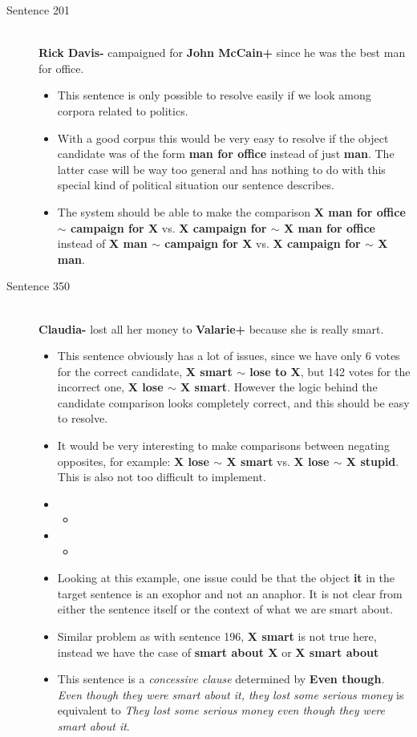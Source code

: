 \documentclass{article}
\newcommand{\insertcode}[2]{\begin{itemize}\item[]\end{itemize}} %
\begin{document}
\begin{description}
  \item[Sentence 201] \hfill \\
  {\bf Rick Davis-} campaigned for {\bf John McCain+} since he was the best man for office.
  \begin{itemize}
  	\item This sentence is only possible to resolve easily if we look among corpora related to politics.
  	\item With a good corpus this would be very easy to resolve if the object candidate was of the form {\bf man for office} instead of just {\bf man}. The latter case will be way too general and has nothing to do with this special kind of political situation our sentence describes.
  	\item The system should be able to make the comparison {\bf X man for office $\sim$ campaign for X} vs. {\bf X campaign for $\sim$ X man for office} instead of {\bf X man $\sim$ campaign for X} vs. {\bf X campaign for $\sim$ X man}. 
  \end{itemize}

  \item[Sentence 350] \hfill \\
  {\bf Claudia-} lost all her money to {\bf Valarie+} because she is really smart.
  \begin{itemize}
  	\item This sentence obviously has a lot of issues, since we have only 6 votes for the correct candidate, {\bf X smart $\sim$ lose to X}, but 142 votes for the incorrect one, {\bf X lose $\sim$ X smart}. However the logic behind the candidate comparison looks completely correct, and this should be easy to resolve.
  	\item It would be very interesting to make comparisons between negating opposites, for example: {\bf X lose $\sim$ X smart} vs. {\bf X lose $\sim$ X stupid}. This is also not too difficult to implement.
  	\item \insertcode{"Scripts/350/350-1.sentence"}{Context from $R_1$ and $R_2$.}
  	\item \insertcode{"Scripts/350/350-2.sentence"}{Target sentence for $R_1$ and $R_2$.}
  	\item Looking at this example, one issue could be that the object {\bf it} in the target sentence is an exophor and not an anaphor. It is not clear from either the sentence itself or the context of what we are smart about. 
  	\item Similar problem as with sentence 196, {\bf X smart} is not true here, instead we have the case of {\bf smart about X} or {\bf X smart about}
  	\item This sentence is a {\it concessive clause} determined by {\bf Even though}. {\it Even though they were smart about it, they lost some serious money} is equivalent to {\it They lost some serious money even though they were smart about it}.
  \end{itemize}


\end{description}
\end{document}
